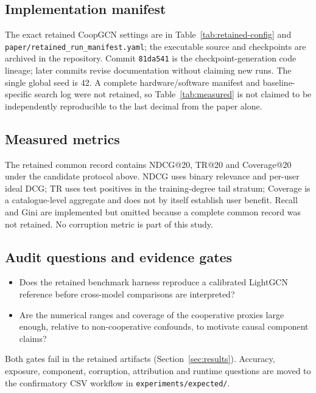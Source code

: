 \documentclass[a4paper,fleqn,longmktitle]{cas-dc}
\begin{document}
\subsection{Implementation manifest}
\label{sec:repro}

The exact retained CoopGCN settings are in
Table~\ref{tab:retained-config} and
\texttt{paper/retained\_run\_manifest.yaml}; the executable source and
checkpoints are archived in the repository. Commit \texttt{81da541} is the checkpoint-generation
code lineage; later commits revise documentation without claiming new runs. The single global seed is 42. A complete
hardware/software manifest and baseline-specific search log were not retained,
so Table~\ref{tab:measured} is not claimed to be independently reproducible to
the last decimal from the paper alone.

\subsection{Measured metrics}
\label{sec:metrics}

The retained common record contains NDCG@20, TR@20 and Coverage@20 under the
candidate protocol above. NDCG uses binary relevance and per-user ideal DCG;
TR uses test positives in the training-degree tail stratum; Coverage is a
catalogue-level aggregate and does not by itself establish user benefit.
Recall and Gini are implemented but omitted because a complete common record
was not retained. No corruption metric is part of this study.

\subsection{Audit questions and evidence gates}
\label{sec:rqs}

\begin{itemize}
\item[\textbf{AQ1}] Does the retained benchmark harness reproduce a calibrated
LightGCN reference before cross-model comparisons are interpreted?
\item[\textbf{AQ2}] Are the numerical ranges and coverage of the cooperative
proxies large enough, relative to non-cooperative confounds, to motivate causal
component claims?
\end{itemize}

Both gates fail in the retained artifacts (Section~\ref{sec:results}). Accuracy,
exposure, component, corruption, attribution and runtime questions are moved to
the confirmatory CSV workflow in \texttt{experiments/expected/}.
\end{document}
